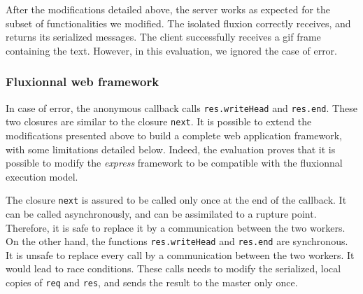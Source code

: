 After the modifications detailed above, the server works as expected for the subset of functionalities we modified.
The isolated fluxion correctly receives, and returns its serialized messages.
The client successfully receives a gif frame containing the text.
However, in this evaluation, we ignored the case of error.

\subsubsection{Fluxionnal web framework}

In case of error, the anonymous callback calls \texttt{res.writeHead} and \texttt{res.end}.
These two closures are similar to the closure \texttt{next}.
It is possible to extend the modifications presented above to build a complete web application framework, with some limitations detailed below.
Indeed, the evaluation proves that it is possible to modify the \textit{express} framework to be compatible with the fluxionnal execution model.

The closure \texttt{next} is assured to be called only once at the end of the callback.
It can be called asynchronously, and can be assimilated to a rupture point.
Therefore, it is safe to replace it by a communication between the two workers.
On the other hand, the functions \texttt{res.writeHead} and \texttt{res.end} are synchronous.
It is unsafe to replace every call by a communication between the two workers.
It would lead to race conditions.
These calls needs to modify the serialized, local copies of \texttt{req} and \texttt{res}, and sends the result to the master only once.